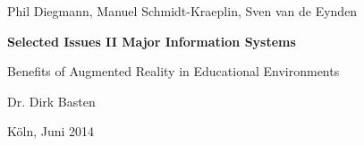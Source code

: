 \vspace*{1mm}

\thispagestyle{empty}
Phil Diegmann, Manuel Schmidt-Kraeplin, Sven van de Eynden

\vspace*{32mm}

% 
\begin{center}
\textbf{
    Selected Issues II
\linebreak
    Major Information Systems
}
\end{center}

\vspace*{32mm}

\begin{center}
\LARGE 
Benefits of Augmented Reality in Educational Environments
\end{center}

\vspace*{32mm}

\begin{center}
Dr. Dirk Basten
\end{center}

\vspace*{32mm}

\begin{center}
Köln, Juni 2014
\end{center}